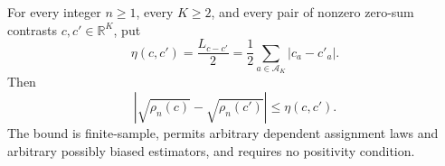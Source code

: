 For every integer \(n\geq1\), every \(K\geq2\), and every pair of nonzero zero-sum contrasts \(c,c'\in\mathbb R^K\), put
\[
 \eta(c,c')=\frac{L_{c-c'}}2
 =\frac12\sum_{a\in\mathcal A_K}|c_a-c'_a|.
\]
Then
\[
 \left|\sqrt{\rho_n(c)}-\sqrt{\rho_n(c')}\right|
 \leq \eta(c,c').
\]
The bound is finite-sample, permits arbitrary dependent assignment laws and arbitrary possibly biased estimators, and requires no positivity condition.
